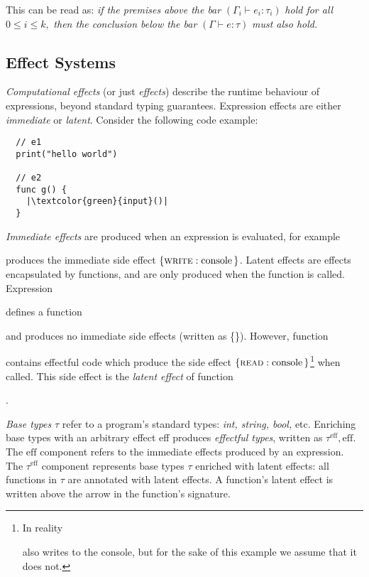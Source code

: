 This can be read as: \textit{if the premises above the bar} \(( \Gamma_i \vdash e_i : \tau_i )\) \textit{hold for all} \(0 \leq i \leq k, \) \textit{then the conclusion below the bar} \(( \Gamma \vdash e : \tau )\) \textit{must also hold.}

\subsection{Effect Systems}

\label{sec:2.3.2}

\textit{Computational effects} (or just \textit{effects}) describe the runtime behaviour of expressions, beyond standard typing guarantees. Expression effects are either \textit{immediate} or \textit{latent}. Consider the following code example:

\begin{verbatim}
  // e1
  print("hello world")
  
  // e2
  func g() { 
    |\textcolor{green}{input}()| 
  }
\end{verbatim}

\textit{Immediate effects} are produced when an expression is evaluated, for example  produces the immediate side effect \( \{ \textsc{write} : \text{console} \, \} \). Latent effects are effects encapsulated by functions, and are only produced when the function is called. Expression  defines a function  and produces no immediate side effects (written as \{\}). However, function  contains effectful code which produce the side effect \( \{ \textsc{read} : \text{console} \, \} \)\footnote{In reality {}\ignore{\texttt{()}} also writes to the console, but for the sake of this example we assume that it does not.} when called. This side effect is the \textit{latent effect} of function .

\textit{Base types} \( \tau \) refer to a program's standard types: \textit{int, string, bool,} etc. Enriching base types with an arbitrary effect \textrm{eff} produces \textit{effectful types}, written as \( \tau^\textrm{eff}, \textrm{eff} \). The \( \textrm{eff} \) component refers to the immediate effects produced by an expression. The \( \tau^\textrm{eff} \) component represents base types \( \tau \) enriched with latent effects: all functions in \( \tau \) are annotated with latent effects. A function's latent effect is written above the arrow in the function's signature.

